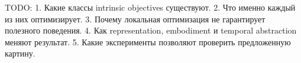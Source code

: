 TODO:  
1. Какие классы intrinsic objectives существуют.
2. Что именно каждый из них оптимизирует.
3. Почему локальная оптимизация не гарантирует полезного поведения.
4. Как representation, embodiment и temporal abstraction меняют результат.
5. Какие эксперименты позволяют проверить предложенную картину.
